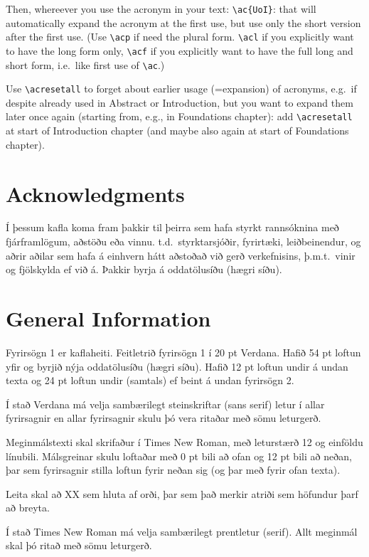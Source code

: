 \documentclass[a4paper,12pt,twoside,BCOR=10mm]{scrbook}
\begin{document}
Then, whereever you use the acronym in your text: \verb|\ac{UoI}|:
that will automatically expand the acronym at the first use, but use
only the short version after the first use.  (Use \verb|\acp| if need
the plural form. \verb|\acl| if you explicitly want to have the long
form only, \verb|\acf| if you explicitly want to have the full long
and short form, i.e.\ like first use of \verb|\ac|.)

Use \verb|\acresetall| to forget about earlier usage (=expansion) of
acronyms, e.g.\ if despite already used in Abstract or Introduction,
but you want to expand them later once again (starting from, e.g., in
Foundations chapter): add \verb|\acresetall| at start of Introduction
chapter (and maybe also again at start of Foundations chapter).

\chapter*{Acknowledgments}
Í þessum kafla koma fram þakkir til þeirra sem hafa styrkt rannsóknina með fjárframlögum, aðstöðu eða vinnu. t.d.\ styrktarsjóðir, fyrirtæki, leiðbeinendur, og aðrir aðilar sem hafa á einhvern hátt aðstoðað við gerð verkefnisins, þ.m.t.\ vinir og fjölskylda ef við á. Þakkir byrja á oddatölusíðu (hægri síðu).


\chapter{General Information}
\setcounter{page}{1}
Fyrirsögn 1 er kaflaheiti. Feitletrið fyrirsögn 1 í 20 pt Verdana. Hafið 54 pt loftun yfir og byrjið nýja oddatölusíðu (hægri síðu). Hafið 12 pt loftun undir á undan texta og 24 pt loftun undir (samtals) ef beint á undan fyrirsögn 2.

Í stað Verdana má velja sambærilegt steinskriftar (sans serif) letur í allar fyrirsagnir en allar fyrirsagnir skulu þó vera ritaðar með sömu leturgerð.

Meginmálstexti skal skrifaður í Times New Roman, með leturstærð 12 og einföldu línubili. Málsgreinar skulu loftaðar með 0 pt bili að ofan og 12 pt bili að neðan, þar sem fyrirsagnir stilla loftun fyrir neðan sig (og þar með fyrir ofan texta).

Leita skal að XX sem hluta af orði, þar sem það merkir atriði sem höfundur þarf að breyta.

Í stað Times New Roman má velja sambærilegt prentletur (serif). Allt meginmál skal þó ritað með sömu leturgerð. 
\end{document}
